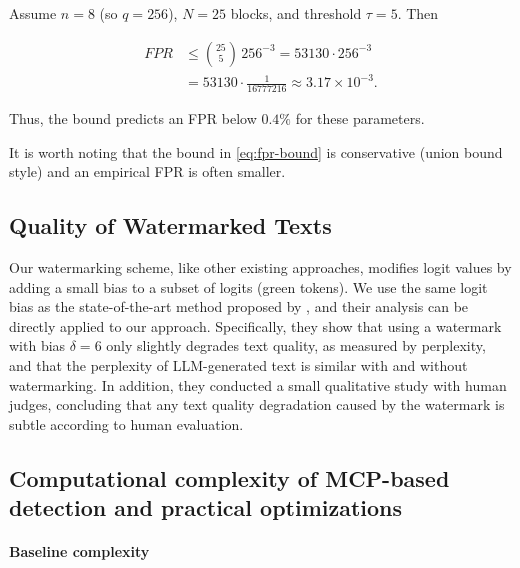 \documentclass[a4paper,11pt]{llncs}
\begin{document}
Assume $n=8$ (so $q=256$), $N=25$ blocks, and threshold $\tau=5$. Then

\begin{equation}
\label{eq:ex1}
\begin{aligned}
    FPR
    &\le \binom{25}{5}\,256^{-3}
    = 53130 \cdot 256^{-3} \\
    &= 53130 \cdot \frac{1}{16777216}
    \approx 3.17\times 10^{-3}.
\end{aligned}
\end{equation}

Thus, the bound predicts an FPR below $0.4\%$ for these parameters.

It is worth noting that the bound in \eqref{eq:fpr-bound} is conservative (union bound style) and an empirical FPR is often smaller.


\subsection{Quality of Watermarked Texts}

Our watermarking scheme, like other existing approaches, modifies logit values by adding a small bias to a subset of logits (green tokens). We use the same logit bias as the state-of-the-art method proposed by \cite{Qu:2024aa}, and their analysis can be directly applied to our approach. Specifically, they show that using a watermark with bias $\delta = 6$ only slightly degrades text quality, as measured by perplexity, and that the perplexity of LLM-generated text is similar with and without watermarking. In addition, they conducted a small qualitative study with human judges, concluding that any text quality degradation caused by the watermark is subtle according to human evaluation.


\subsection{Computational complexity of MCP-based detection and practical optimizations}
\label{app:mcp-complexity}

\paragraph{Baseline complexity}
\end{document}
